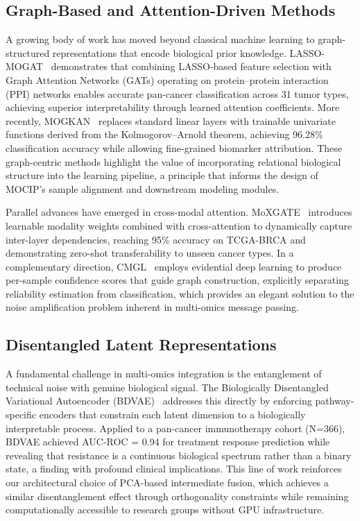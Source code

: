 \documentclass[twocolumn]{article}
\begin{document}
\subsection{Graph-Based and Attention-Driven Methods}
A growing body of work has moved beyond classical machine learning to graph-structured representations that encode biological prior knowledge. LASSO-MOGAT~\cite{alharbi2024lassomogat} demonstrates that combining LASSO-based feature selection with Graph Attention Networks (GATs) operating on protein–protein interaction (PPI) networks enables accurate pan-cancer classification across 31 tumor types, achieving superior interpretability through learned attention coefficients. More recently, MOGKAN~\cite{alharbi2025mogkan} replaces standard linear layers with trainable univariate functions derived from the Kolmogorov–Arnold theorem, achieving 96.28\% classification accuracy while allowing fine-grained biomarker attribution. These graph-centric methods highlight the value of incorporating relational biological structure into the learning pipeline, a principle that informs the design of MOCIP's sample alignment and downstream modeling modules.

Parallel advances have emerged in cross-modal attention. MoXGATE~\cite{dip2025moxgate} introduces learnable modality weights combined with cross-attention to dynamically capture inter-layer dependencies, reaching 95\% accuracy on TCGA-BRCA and demonstrating zero-shot transferability to unseen cancer types. In a complementary direction, CMGL~\cite{fan2026cmgl} employs evidential deep learning to produce per-sample confidence scores that guide graph construction, explicitly separating reliability estimation from classification, which provides an elegant solution to the noise amplification problem inherent in multi-omics message passing.

\subsection{Disentangled Latent Representations}
A fundamental challenge in multi-omics integration is the entanglement of technical noise with genuine biological signal. The Biologically Disentangled Variational Autoencoder (BDVAE)~\cite{tariq2025bdvae} addresses this directly by enforcing pathway-specific encoders that constrain each latent dimension to a biologically interpretable process. Applied to a pan-cancer immunotherapy cohort (N=366), BDVAE achieved AUC-ROC = 0.94 for treatment response prediction while revealing that resistance is a continuous biological spectrum rather than a binary state, a finding with profound clinical implications. This line of work reinforces our architectural choice of PCA-based intermediate fusion, which achieves a similar disentanglement effect through orthogonality constraints while remaining computationally accessible to research groups without GPU infrastructure.
\end{document}

